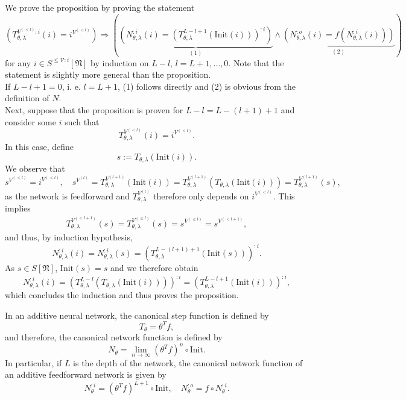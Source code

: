 \documentclass[a4paper,11pt]{report}
\newcommand{\In}{\text{Init}}
\begin{document}
\begin{Bew}
We prove the proposition by proving the statement 
\[
\left(T_{\theta,\lambda}^{V^{(< l)}:i}(i)=i^{V^{(< l)}}\right)
\Rightarrow
\left(
\underbrace{\left(
N_{\theta,\lambda}^{:i}(i)=\left(T_{\theta,\lambda}^{L-l+1}\left(\In(i)\right)\right)^{:i}
\right)}_{(1)}
\wedge
\underbrace{\left( 
N_{\theta,\lambda}^{:o}(i)=f\left(N_{\theta,\lambda}^{:i}(i)\right)
\right)}_{(2)}
\right)
\]
for any $i\in S^{\le\mathcal{V}:i}[\mathfrak{N}]$ by induction on $L-l$, $l=L+1,\dotsc, 0$. Note that the statement is slightly more general than the proposition.\\
If $L-l+1=0$, i. e. $l=L+1$, (1) follows directly and (2) is obvious from the definition of $N$.\\
Next, suppose that the proposition is proven for $L-l=L-(l+1)+1$ and consider some $i$ such that
\[
T_{\theta,\lambda}^{V^{(< l)}}(i)=i^{V^{(< l)}}.
\]
In this case, define
\[
s:=T_{\theta,\lambda}\left(\In(i)\right).
\]
We observe that
\[
s^{V^{(< l)}}=i^{V^{(< l)}},
\quad
s^{V^{(l)}}=T_{\theta,\lambda}^{V^{(l+1)}}\left(\In(i)\right)=T_{\theta,\lambda}^{V^{(l+1)}}\left(T_{\theta,\lambda}\left(\In(i)\right)\right)=T_{\theta,\lambda}^{V^{(l+1)}}(s),
\]
as the network is feedforward and $T_{\theta,\lambda}^{V^{(l)}}$ therefore only depends on $i^{V^{(< l)}}$. This implies
\begin{align*}
T_{\theta,\lambda}^{V^{(< l+1)}}(s)=T_{\theta,\lambda}^{V^{(\le l)}}(s)=s^{V^{(\le l)}}=s^{V^{(<l+1)}},
\end{align*}
and thus, by induction hypothesis, 
\[
N_{\theta,\lambda}^{:i}(i)=N_{\theta,\lambda}^{:i}(s)=\left(T_{\theta,\lambda}^{L-(l+1)+1}\left(\In(s)\right)\right)^{:i}.
\]
As $s\in S[\mathfrak{N}]$, $\In(s)=s$ and we therefore obtain
\[
N_{\theta,\lambda}^{:i}(i)=\left(T_{\theta,\lambda}^{L-l}\left(T_{\theta,\lambda}\left(\In(i)\right)\right)\right)^{:i}=\left(T_{\theta,\lambda}^{L-l+1}\left(\In(i)\right)\right)^{:i},
\]
which concludes the induction and thus proves the proposition.
\end{Bew}

\begin{Par}
In an additive neural network, the canonical step function is defined by
\begin{equation}
T_{\theta}=\theta^Tf,
\end{equation}
and therefore, the canonical network function is defined by 
\begin{equation}
N_{\theta}=\lim_{n\to\infty}(\theta^T f)^n\circ\In.
\end{equation}
In particular, if $L$ is the depth of the network, the canonical network function of an additive feedforward network is given by
\[
N_{\theta}^{:i}=(\theta^T f)^{L+1}\circ\In,
\quad
N_{\theta}^{:o}=f\circ N_{\theta}^{:i}.
\]
\end{Par}
\end{document}
